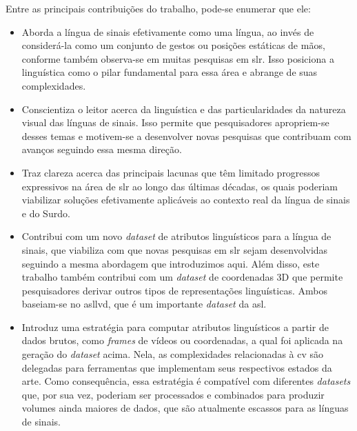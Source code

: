 
Entre as principais contribuições do trabalho, pode-se enumerar que ele:

\begin{itemize}
      \item Aborda a língua de sinais efetivamente como uma língua, ao invés de considerá-la como um conjunto de gestos ou posições estáticas de mãos, conforme também observa-se em muitas pesquisas em \acrshort{slr}.
            Isso posiciona a linguística como o pilar fundamental para essa área e abrange de suas complexidades.

      \item Conscientiza o leitor acerca da linguística e das particularidades da natureza visual das línguas de sinais.
            Isso permite que pesquisadores apropriem-se desses temas e motivem-se a desenvolver novas pesquisas que contribuam com avanços seguindo essa mesma direção.

      \item Traz clareza acerca das principais lacunas que têm limitado progressos expressivos na área de \acrshort{slr} ao longo das últimas décadas, os quais poderiam viabilizar soluções efetivamente aplicáveis ao contexto real da língua de sinais e do Surdo.

      \item Contribui com um novo \textit{dataset} de atributos linguísticos para a língua de sinais, que viabiliza com que novas pesquisas em \acrshort{slr} sejam desenvolvidas seguindo a mesma abordagem que introduzimos aqui.
            Além disso, este trabalho também contribui com um \textit{dataset} de coordenadas 3D que permite pesquisadores derivar outros tipos de representações linguísticas.
            Ambos baseiam-se no \acrshort{asllvd}, que é um importante \textit{dataset} da \acrshort{asl}.

      \item Introduz uma estratégia para computar atributos linguísticos a partir de dados brutos, como \textit{frames} de vídeos ou coordenadas, a qual foi aplicada na geração do \textit{dataset} acima.
            Nela, as complexidades relacionadas à \acrlong{cv} são delegadas para ferramentas que implementam seus respectivos estados da arte.
            Como consequência, essa estratégia é compatível com diferentes \textit{datasets} que, por sua vez, poderiam ser processados e combinados para produzir volumes ainda maiores de dados, que são atualmente escassos para as línguas de sinais.


\end{itemize}
